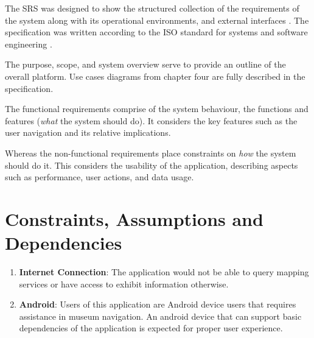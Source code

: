 

The SRS was designed to show the structured collection of the requirements of the system along with its operational environments, and external interfaces \cite{IEEE24765}. The specification was written according to the ISO standard for systems and software engineering \cite{IEEE29148}.

The purpose, scope, and system overview serve to provide an outline of the overall platform. Use cases diagrams from chapter four are fully described in the specification.

The functional requirements comprise of the system behaviour, the functions and features (\textit{what} the system should do). It considers the key features such as the user navigation and its relative implications.

Whereas the non-functional requirements place constraints on \textit{how} the system should do it. This considers the usability of the application, describing aspects such as performance, user actions, and data usage.

\section*{Constraints, Assumptions and Dependencies}
\begin{enumerate}
    \item \textbf{Internet Connection}: The application would not be able to query mapping services or have access to exhibit information otherwise.
    \item \textbf{Android}: Users of this application are Android device users that requires assistance in museum navigation. An android device that can support basic dependencies of the application is expected for proper user experience.
\end{enumerate}
